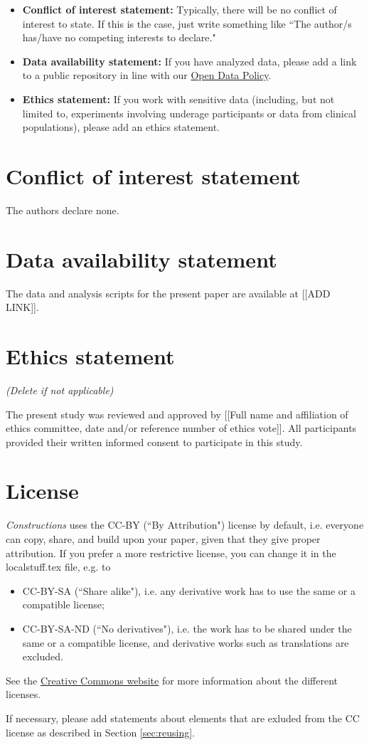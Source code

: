 \begin{itemize}
    \item \textbf{Conflict of interest statement:} Typically, there will be no conflict of interest to state. If this is the case, just write something like ``The author/s has/have no competing interests to declare."
    \item \textbf{Data availability statement:} If you have analyzed data, please add a link to a public repository in line with our \href{https://constructions.journals.hhu.de/about}{Open Data Policy}. 
    \item \textbf{Ethics statement:} If you work with sensitive data (including, but not limited to, experiments involving underage participants or data from clinical populations), please add an ethics statement. 

    
\end{itemize}

\section*{Conflict of interest statement}

The authors declare none. %

\section*{Data availability statement}

The data and analysis scripts for the present paper are available at [[ADD LINK]].

\section*{Ethics statement}
\textit{(Delete if not applicable)}

\noindent The present study was reviewed and approved by [[Full name and affiliation of ethics committee, date and/or reference number of ethics vote]]. All participants provided their written informed consent to participate in this study.

\section*{License}
\doclicenseIcon \doclicenseText

\noindent \textit{Constructions} uses the CC-BY (``By Attribution") license by default, i.e. everyone can copy, share, and build upon your paper, given that they give proper attribution. If you prefer a more restrictive license, you can change it in the localstuff.tex file, e.g. to
\begin{itemize}
    \item CC-BY-SA (``Share alike"), i.e. any derivative work has to use the same or a compatible license;
    \item CC-BY-SA-ND (``No derivatives"), i.e. the work has to be shared under the same or a compatible license, and derivative works such as translations are excluded.
\end{itemize}

\noindent See the \href{https://creativecommons.org/}{Creative Commons website} for more information about the different licenses.

If necessary, please add statements about elements that are exluded from the CC license as described in Section \ref{sec:reusing}.

\printbibliography


